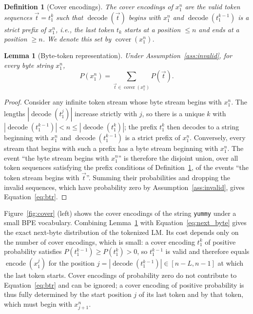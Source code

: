 \documentclass{article} %
\newtheorem{definition}{Definition}
\newtheorem{lemma}{Lemma}
\newcommand{\enc}{\operatorname{encode}}
\newcommand{\dec}{\operatorname{decode}}
\newcommand{\cover}{\operatorname{cover}}
\newcommand{\tseq}{\vec{t}}
\newcommand{\tok}[1]{\texttt{#1}}
\begin{document}
\begin{definition}[Cover encodings]
\label{def:cover}
The \emph{cover encodings} of $x_1^n$ are the valid token sequences $\tseq = t_1^k$ such that $\dec(\tseq)$ begins with $x_1^n$ and $\dec(t_1^{k-1})$ is a strict prefix of $x_1^n$, i.e., the last token $t_k$ starts at a position $\le n$ and ends at a position $\ge n$. We denote this set by $\cover(x_1^n)$.
\end{definition}

\begin{lemma}[Byte-token representation]
\label{lem:btr}
Under Assumption~\ref{ass:invalid}, for every byte string $x_1^n$,
\begin{equation}
P(x_1^n) = \sum_{\tseq\in\cover(x_1^n)} P(\tseq).
\label{eq:btr}
\end{equation}
\end{lemma}
\begin{proof}
Consider any infinite token stream whose byte stream begins with $x_1^n$. The lengths $|\dec(t_1^j)|$ increase strictly with $j$, so there is a unique $k$ with $|\dec(t_1^{k-1})| < n \le |\dec(t_1^k)|$; the prefix $t_1^k$ then decodes to a string beginning with $x_1^n$ and $\dec(t_1^{k-1})$ is a strict prefix of $x_1^n$. Conversely, every stream that begins with such a prefix has a byte stream beginning with $x_1^n$. The event ``the byte stream begins with $x_1^n$'' is therefore the disjoint union, over all token sequences satisfying the prefix conditions of Definition~\ref{def:cover}, of the events ``the token stream begins with $\tseq$''. Summing their probabilities and dropping the invalid sequences, which have probability zero by Assumption~\ref{ass:invalid}, gives Equation~\ref{eq:btr}.
\end{proof}

Figure~\ref{fig:cover} (left) shows the cover encodings of the string \tok{yummy} under a small BPE vocabulary. Combining Lemma~\ref{lem:btr} with Equation~\ref{eq:next_byte} gives the exact next-byte distribution of the tokenized LM. Its cost depends only on the number of cover encodings, which is small: a cover encoding $t_1^k$ of positive probability satisfies $P(t_1^{k-1}) \ge P(t_1^k) > 0$, so $t_1^{k-1}$ is valid and therefore equals $\enc(x_1^{j})$ for the position $j = |\dec(t_1^{k-1})| \in [n-L, n-1]$ at which the last token starts. Cover encodings of probability zero do not contribute to Equation~\ref{eq:btr} and can be ignored; a cover encoding of positive probability is thus fully determined by the start position $j$ of its last token and by that token, which must begin with $x_{j+1}^n$.
\end{document}
